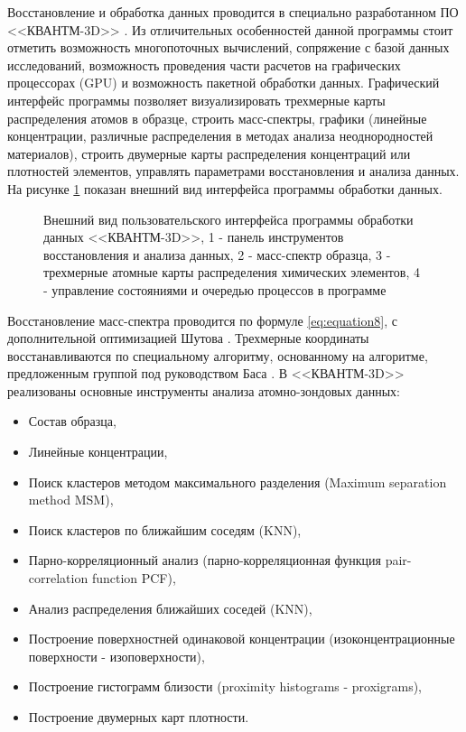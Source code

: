 Восстановление и обработка данных проводится в специально разработанном ПО <<КВАНТМ-3D>> \cite{KVANTM}. Из отличительных особенностей данной программы стоит отметить возможность многопоточных вычислений, сопряжение с базой данных исследований, возможность проведения части расчетов на графических процессорах (GPU) и возможность пакетной обработки данных. Графический интерфейс программы позволяет визуализировать трехмерные карты распределения атомов в образце, строить масс-спектры, графики (линейные концентрации, различные распределения в методах анализа неоднородностей материалов), строить двумерные карты распределения концентраций или плотностей элементов, управлять параметрами восстановления и анализа данных. На рисунке \cref{fig:APPLE_kvant} показан внешний вид интерфейса программы обработки данных.

\begin{figure}[htb]
	\caption{Внешний вид пользовательского интерфейса программы обработки данных <<КВАНТМ-3D>>, 1 - панель инструментов восстановления и анализа данных, 2 - масс-спектр образца, 3 - трехмерные атомные карты распределения химических элементов, 4 - управление состояниями и очередью процессов в программе}
	\label{fig:APPLE_kvant}
\end{figure}

Восстановление масс-спектра проводится по формуле \cref{eq:equation8}, с дополнительной оптимизацией Шутова \cite{Shutov19}. Трехмерные координаты восстанавливаются по специальному алгоритму, основанному на алгоритме, предложенным группой под руководством Баса \cite{Bas95}. В <<КВАНТМ-3D>> реализованы основные инструменты анализа атомно-зондовых данных:

\begin{itemize}
	\item Состав образца,
	\item Линейные концентрации,
	\item Поиск кластеров методом максимального разделения (Maximum separation method MSM),
	\item Поиск кластеров по ближайшим соседям (KNN),
	\item Парно-корреляционный анализ (парно-корреляционная функция pair-correlation function PCF),
	\item Анализ распределения ближайших соседей (KNN),
	\item Построение поверхностней одинаковой концентрации (изоконцентрационные поверхности - изоповерхности),
	\item Построение гистограмм близости (proximity histograms - proxigrams),
	\item Построение двумерных карт плотности.
\end{itemize}

